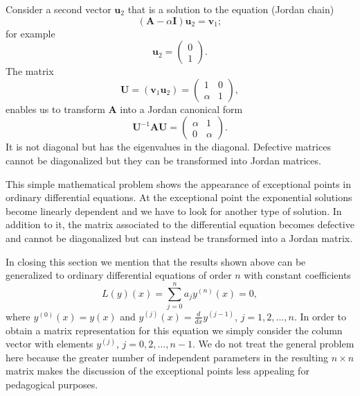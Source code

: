 \documentclass{article}
\begin{document}
Consider a second vector $\mathbf{u}_{2}$ that is a solution to the equation
(Jordan chain\cite{GRS07})
\begin{equation}
\left( \mathbf{A}-\alpha \mathbf{I}\right) \mathbf{u}_{2}=\mathbf{v}_{1};
\end{equation}
for example
\begin{equation}
\mathbf{u}_{2}=\left(
\begin{array}{l}
0 \\
1
\end{array}
\right) .  \label{eq:eigenvector_v2}
\end{equation}
The matrix
\begin{equation}
\mathbf{U}=\left( \mathbf{v}_{1}\mathbf{u}_{2}\right) =\left(
\begin{array}{cc}
1 & 0 \\
\alpha  & 1
\end{array}
\right) ,  \label{eq:mat_U_gen}
\end{equation}
enables us to transform $\mathbf{A}$ into a Jordan canonical form
\begin{equation}
\mathbf{U}^{-1}\mathbf{AU}=\left(
\begin{array}{cc}
\alpha  & 1 \\
0 & \alpha
\end{array}
\right) .  \label{eq:mat_Jordan_gen}
\end{equation}
It is not diagonal but has the eigenvalues in the diagonal. Defective
matrices cannot be diagonalized but they can be transformed into Jordan
matrices.

This simple mathematical problem shows the appearance of exceptional points
in ordinary differential equations. At the exceptional point the exponential
solutions become linearly dependent and we have to look for another type of
solution. In addition to it, the matrix associated to the differential
equation becomes defective and cannot be diagonalized but can instead be
transformed into a Jordan matrix.

In closing this section we mention that the results shown above can be
generalized to ordinary differential equations of order $n$ with constant
coefficients
\begin{equation}
L(y)(x)=\sum_{j=0}^{n}a_{j}y^{(n)}(x)=0,
\end{equation}
where $y^{(0)}(x)=y(x)$ and $y^{(j)}(x)=\frac{d}{dx}y^{(j-1)}$, $%
j=1,2,\ldots ,n$. In order to obtain a matrix representation for this
equation we simply consider the column vector with elements $y^{(j)}$, $%
j=0,2,\ldots ,n-1$. We do not treat the general problem here because the
greater number of independent parameters in the resulting $n\times n$ matrix
makes the discussion of the exceptional points less appealing for
pedagogical purposes.
\end{document}
